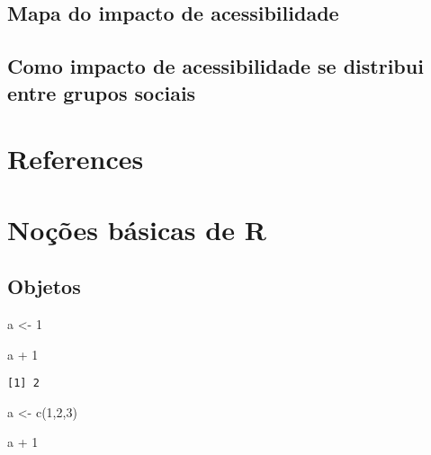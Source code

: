 \documentclass[
  letterpaper,
  DIV=11,
  numbers=noendperiod]{scrreprt}
\newenvironment{Shaded}{\begin{snugshade}}{\end{snugshade}}
\newcommand{\DecValTok}[1]{\textcolor[rgb]{0.68,0.00,0.00}{#1}}
\newcommand{\FunctionTok}[1]{\textcolor[rgb]{0.28,0.35,0.67}{#1}}
\newcommand{\NormalTok}[1]{\textcolor[rgb]{0.00,0.23,0.31}{#1}}
\newcommand{\OtherTok}[1]{\textcolor[rgb]{0.00,0.23,0.31}{#1}}
\newcommand{\SpecialCharTok}[1]{\textcolor[rgb]{0.37,0.37,0.37}{#1}}
\newlength{\cslhangindent}
\newlength{\cslentryspacingunit} %
\newenvironment{CSLReferences}[2] %
 {%
  \setlength{\parindent}{0pt}
  \ifodd #1
  \let\oldpar\par
  \def\par{\hangindent=\cslhangindent\oldpar}
  \fi
  \setlength{\parskip}{#2\cslentryspacingunit}
 }%
 {}
\begin{document}
\hypertarget{mapa-do-impacto-de-acessibilidade-1}{%
\section{Mapa do impacto de
acessibilidade}\label{mapa-do-impacto-de-acessibilidade-1}}

\hypertarget{como-impacto-de-acessibilidade-se-distribui-entre-grupos-sociais-1}{%
\section{Como impacto de acessibilidade se distribui entre grupos
sociais}\label{como-impacto-de-acessibilidade-se-distribui-entre-grupos-sociais-1}}

\hypertarget{references}{%
\chapter*{References}\label{references}}

\hypertarget{refs}{}
\begin{CSLReferences}{0}{0}
\end{CSLReferences}

\appendix
{}

\hypertarget{nouxe7uxf5es-buxe1sicas-de-r}{%
\chapter{Noções básicas de R}\label{nouxe7uxf5es-buxe1sicas-de-r}}

\hypertarget{objetos}{%
\section{Objetos}\label{objetos}}

\begin{Shaded}
\begin{Highlighting}[]
\NormalTok{a }\OtherTok{\textless{}{-}} \DecValTok{1}

\NormalTok{a }\SpecialCharTok{+} \DecValTok{1}
\end{Highlighting}
\end{Shaded}

\begin{verbatim}
[1] 2
\end{verbatim}

\begin{Shaded}
\begin{Highlighting}[]
\NormalTok{a }\OtherTok{\textless{}{-}} \FunctionTok{c}\NormalTok{(}\DecValTok{1}\NormalTok{,}\DecValTok{2}\NormalTok{,}\DecValTok{3}\NormalTok{)}

\NormalTok{a }\SpecialCharTok{+} \DecValTok{1}
\end{Highlighting}
\end{Shaded}
\end{document}
